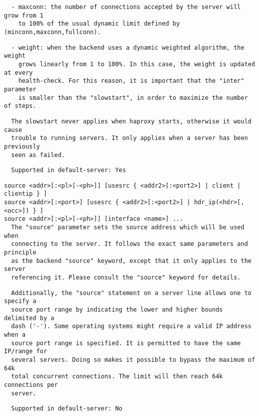 \begin{verbatim}
  - maxconn: the number of connections accepted by the server will grow from 1
    to 100% of the usual dynamic limit defined by (minconn,maxconn,fullconn).
\end{verbatim}

\begin{verbatim}
  - weight: when the backend uses a dynamic weighted algorithm, the weight
    grows linearly from 1 to 100%. In this case, the weight is updated at every
    health-check. For this reason, it is important that the "inter" parameter
    is smaller than the "slowstart", in order to maximize the number of steps.
\end{verbatim}

\begin{verbatim}
  The slowstart never applies when haproxy starts, otherwise it would cause
  trouble to running servers. It only applies when a server has been previously
  seen as failed.
\end{verbatim}

\begin{verbatim}
  Supported in default-server: Yes
\end{verbatim}

\begin{verbatim}
source <addr>[:<pl>[-<ph>]] [usesrc { <addr2>[:<port2>] | client | clientip } ]
source <addr>[:<port>] [usesrc { <addr2>[:<port2>] | hdr_ip(<hdr>[,<occ>]) } ]
source <addr>[:<pl>[-<ph>]] [interface <name>] ...
  The "source" parameter sets the source address which will be used when
  connecting to the server. It follows the exact same parameters and principle
  as the backend "source" keyword, except that it only applies to the server
  referencing it. Please consult the "source" keyword for details.
\end{verbatim}

\begin{verbatim}
  Additionally, the "source" statement on a server line allows one to specify a
  source port range by indicating the lower and higher bounds delimited by a
  dash ('-'). Some operating systems might require a valid IP address when a
  source port range is specified. It is permitted to have the same IP/range for
  several servers. Doing so makes it possible to bypass the maximum of 64k
  total concurrent connections. The limit will then reach 64k connections per
  server.
\end{verbatim}

\begin{verbatim}
  Supported in default-server: No
\end{verbatim}


